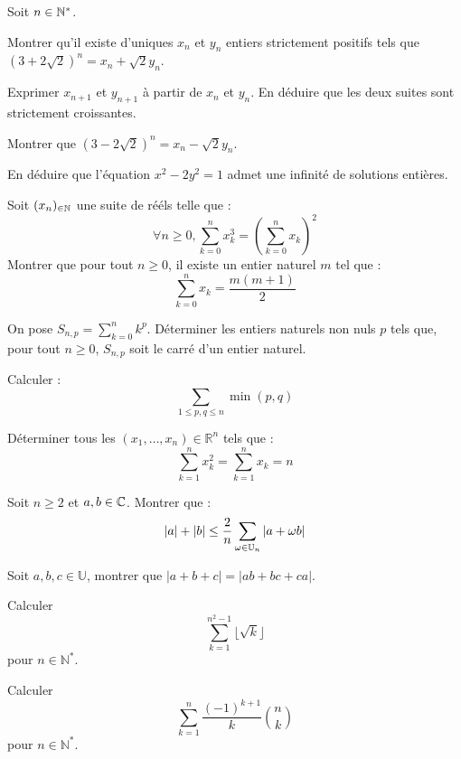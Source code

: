 \begin{exercise}
Soit $n\in\mathbb{N}^*$.
\begin{questions}
\item Montrer qu'il existe d'uniques $x_n$ et $y_n$ entiers strictement positifs tels que $(3+2\sqrt{2})^n=x_n+\sqrt{2}y_n$.
\item Exprimer $x_{n+1}$ et $y_{n+1}$ à partir de $x_{n}$ et $y_{n}$. En déduire que les deux suites sont strictement croissantes.
\item Montrer que $(3-2\sqrt{2})^n=x_n-\sqrt{2}y_n$.
\item En déduire que l'équation $x^2-2y^2=1$ admet une infinité de solutions entières.
\end{questions}
\end{exercise}

\begin{exercise}
\begin{questions}
\item Soit $(x_n)_{\in\mathbb{N}}$ une suite de rééls telle que : $$\forall n \ge0, \sum_{k=0}^nx_k^3=\left(\sum_{k=0}^nx_k\right)^2$$
Montrer que pour tout $n\ge0$, il existe un entier naturel $m$ tel que : $$\sum_{k=0}^nx_k=\frac{m(m+1)}{2}$$
\item On pose $S_{n,p}=\displaystyle\sum_{k=0}^nk^p$. Déterminer les entiers naturels non nuls $p$ tels que, pour tout $n\ge0$, $S_{n,p}$ soit le carré d'un entier naturel.
\end{questions}
\end{exercise}

\begin{exercise}
Calculer :
$$
\sum_{1 \leq p, q \leq n} \min(p,q)
$$
\end{exercise}

\begin{exercise}
Déterminer tous les $(x_1, \dots, x_n) \in \mathbb R^n$ tels que :
$$
\sum_{k=1}^n x_k^2 = \sum_{k=1}^n x_k = n
$$
\end{exercise}

\begin{exercise}
Soit $n \geq 2$ et $a,b \in \mathbb{C}$. Montrer que :
$$
\left|a\right| + \left|b\right| \leq \frac 2 n \sum_{\omega \in \mathbb{U}_n} \left|a + \omega b\right|
$$
\end{exercise}

\begin{exercise}
Soit $a,b,c\in \mathbb U$, montrer que $|a+b+c| = |ab + bc + ca|$.
\end{exercise}

\begin{exercise}
Calculer
$$
\sum_{k=1}^{n^2-1} \lfloor \sqrt{ k } \rfloor
$$
pour $n\in\mathbb N^*$.
\end{exercise}

\begin{exercise}
Calculer
$$
\sum_{k=1}^n \frac {(-1)^{k+1}} k \binom{n}{k}
$$
pour $n\in\mathbb N^*$.
\end{exercise}
